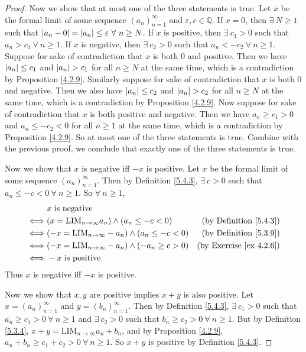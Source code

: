 \begin{proof}
Now we show that at most one of the three statements is true.
Let \(x\) be the formal limit of some sequence \((a_n)_{n = 1}^{\infty}\) and \(\varepsilon, c \in \mathds{Q}\).
If \(x = 0\), then \(\exists\ N \geq 1\) such that \(\abs*{a_n - 0} = \abs*{a_n} \leq \varepsilon \ \forall\ n \geq N\).
If \(x\) is positive, then \(\exists\ c_1 > 0\) such that \(a_n > c_1 \ \forall\ n \geq 1\).
If \(x\) is negative, then \(\exists\ c_2 > 0\) such that \(a_n < -c_2 \ \forall\ n \geq 1\).
Suppose for sake of contradiction that \(x\) is both \(0\) and positive.
Then we have \(\abs*{a_n} \leq c_1\) and \(\abs*{a_n} > c_1\) for all \(n \geq N\) at the same time, which is a contradiction by Proposition \ref{4.2.9}.
Similarly suppose for sake of contradiction that \(x\) is both \(0\) and negative.
Then we also have \(\abs*{a_n} \leq c_2\) and \(\abs*{a_n} > c_2\) for all \(n \geq N\) at the same time, which is a contradiction by Proposition \ref{4.2.9}.
Now suppose for sake of contradiction that \(x\) is both positive and negative.
Then we have \(a_n \geq c_1 > 0\) and \(a_n \leq -c_2 < 0\) for all \(n \geq 1\) at the same time, which is a contradiction by Proposition \ref{4.2.9}.
So at most one of the three statements is true.
Combine with the previous proof, we conclude that exactly one of the three statements is true.

Now we show that \(x\) is negative iff \(-x\) is positive.
Let \(x\) be the formal limit of some sequence \((a_n)_{n = 1}^{\infty}\).
Then by Definition \ref{5.4.3}, \(\exists\ c > 0\) such that \(a_n \leq -c < 0 \ \forall\ n \geq 1\).
So \(\forall\ n \geq 1\),
\begin{align*}
& x \text{ is negative} \\
\iff & (x = \text{LIM}_{n \to \infty} a_n) \land (a_n \leq -c < 0) & \text{(by Definition \ref{5.4.3})} \\
\iff & (-x = \text{LIM}_{n \to \infty} -a_n) \land (a_n \leq -c < 0) & \text{(by Definition \ref{5.3.9})} \\
\iff & (-x = \text{LIM}_{n \to \infty} -a_n) \land (-a_n \geq c > 0) & \text{(by Exercise \ref{ex 4.2.6})} \\
\iff & -x \text{ is positive}.
\end{align*}
Thus \(x\) is negative iff \(-x\) is positive.

Now we show that \(x, y\) are positive implies \(x + y\) is also positive.
Let \(x = (a_n)_{n = 1}^{\infty}\) and \(y = (b_n)_{n = 1}^{\infty}\).
Then by Definition \ref{5.4.3}, \(\exists\ c_1 > 0\) such that \(a_n \geq c_1 > 0 \ \forall\ n \geq 1\) and \(\exists\ c_2 > 0\) such that \(b_n \geq c_2 > 0 \ \forall\ n \geq 1\).
But by Definition \ref{5.3.4}, \(x + y = \text{LIM}_{n \to \infty} a_n + b_n\), and by Proposition \ref{4.2.9}, \(a_n + b_n \geq c_1 + c_2 > 0 \ \forall\ n \geq 1\).
So \(x + y\) is positive by Definition \ref{5.4.3}.


\end{proof}
